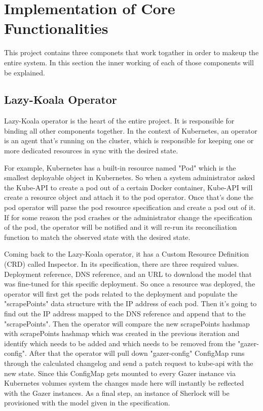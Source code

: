 \section{Implementation of Core Functionalities}

This project contains three componets that work togather in order to makeup the entire system. In this section the inner working of each of those components will be explained.

\subsection{Lazy-Koala Operator}

Lazy-Koala operator is the heart of the entire project. It is responsible for binding all other components together. In the context of Kubernetes, an operator is an agent that's running on the cluster, which is responsible for keeping one or more dedicated resources in sync with the desired state. 

For example, Kubernetes has a built-in resource named "Pod" which is the smallest deployable object in Kubernetes. So when a system administrator asked the Kube-API to create a pod out of a certain Docker container, Kube-API will create a resource object and attach it to the pod operator. Once that's done the pod operator will parse the pod resource specification and create a pod out of it. If for some reason the pod crashes or the administrator change the specification of the pod, the operator will be notified and it will re-run its reconciliation function to match the observed state with the desired state.

Coming back to the Lazy-Koala operator, it has a Custom Resource Definition (CRD) called Inspector. In its specification, there are three required values. Deployment reference, DNS reference, and an URL to download the model that was fine-tuned for this specific deployment. So once a resource was deployed, the operator will first get the pods related to the deployment and populate the "scrapePoints" data structure with the IP address of each pod. Then it's going to find out the IP address mapped to the DNS reference and append that to the "scrapePoints". Then the operator will compare the new scrapePoints hashmap with scrapePoints hashmap which was created in the previous iteration and identify which needs to be added and which needs to be removed from the "gazer-config". After that the operator will pull down "gazer-config" ConfigMap runs through the calculated changelog and send a patch request to kube-api with the new state. Since this ConfigMap gets mounted to every Gazer instance via Kubernetes volumes system the changes made here will instantly be reflected with the Gazer instances. As a final step, an instance of Sherlock will be provisioned with the model given in the specification.

